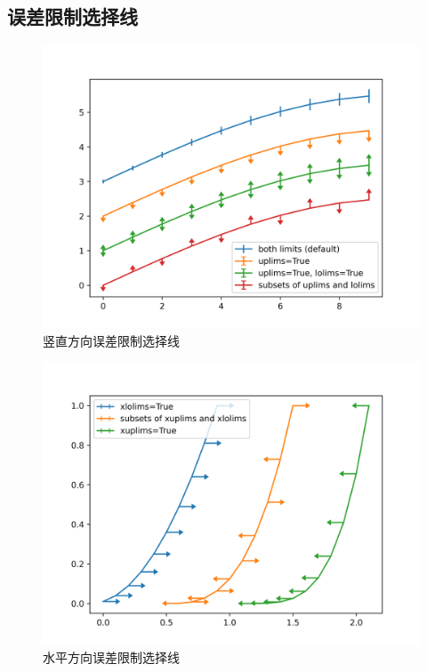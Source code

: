\documentclass[openany]{progbookcn}
\begin{document}
\subsection{误差限制选择线}

\begin{figure}[H]
\centering
\includegraphics[width=0.6 \textwidth]{figs/chapter9/lines/UpLowErrorBar}
\caption{竖直方向误差限制选择线}
\end{figure}

\begin{figure}[H]
\centering
\includegraphics[width=0.6 \textwidth]{figs/chapter9/lines/XYErrorBar}
\caption{水平方向误差限制选择线}
\end{figure}
\end{document}
